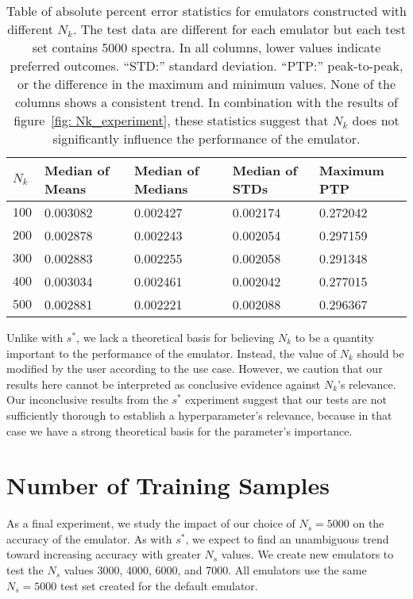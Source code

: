 \begin{table}[ht!]
\centering
\begin{tabular}{l|l|l|l|l}
\hline
$N_k$ & Median of Means & Median of Medians & Median of STDs & Maximum PTP \\ \hline
$100$ & 0.003082 & 0.002427 & 0.002174 & 0.272042 \\
$200$ & 0.002878 & 0.002243 & 0.002054 & 0.297159 \\
$300$ & 0.002883 & 0.002255 & 0.002058 & 0.291348 \\
$400$ & 0.003034 & 0.002461 & 0.002042 & 0.277015 \\
$500$ & 0.002881 & 0.002221 & 0.002088 & 0.296367 \\
\end{tabular}
	\cprotect\caption[$N_k$ Experiment: Percent Error Statistics]{Table of
		absolute percent error statistics
		for emulators constructed with different $N_k$.
		The test data are different for each
  		emulator but each test set contains 5000 spectra.
		In all
		columns, lower values indicate preferred outcomes. ``STD:'' standard
		deviation. ``PTP:'' peak-to-peak, or the difference in the maximum
		and minimum values. None of the columns shows a consistent trend.
		In combination with the results of
		figure~\ref{fig: Nk_experiment}, these statistics suggest that
		$N_k$ does not significantly influence the performance of the
		emulator.} 
 \label{tab: Nk_experiment_percerr_stats}
\end{table}

Unlike with $s^*$, we lack a theoretical basis for believing $N_k$ to be a
quantity important to the performance of the emulator. Instead, the value of
$N_k$ should be modified by the user according to the use case. However, we
caution that our results here cannot be interpreted as conclusive evidence
against $N_k$'s relevance. Our inconclusive results from the $s^*$ experiment
suggest that our tests are not sufficiently thorough to establish a
hyperparameter's relevance, because in that case we have a strong theoretical
basis for the parameter's importance.

\section{Number of Training Samples}
\label{sec: num_samples}

As a final experiment, we study the impact of our choice of
$N_s = 5000$ on the accuracy of the emulator.
As with $s^*$, we expect to find an
unambiguous trend toward increasing accuracy with greater $N_s$ values.
We create new emulators to test the $N_s$ values 3000, 4000, 6000, and 7000.
All emulators use the same $N_s = 5000$ test set created for the default
emulator.


